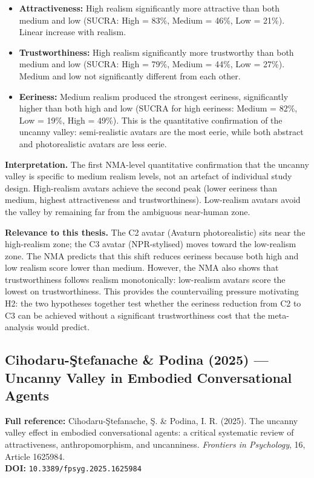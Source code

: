\documentclass[11pt, a4paper]{article}
\begin{document}
\begin{itemize}[leftmargin=2em]
  \item \textbf{Attractiveness:} High realism significantly more attractive than both medium and low (SUCRA: High = 83\%, Medium = 46\%, Low = 21\%). Linear increase with realism.
  \item \textbf{Trustworthiness:} High realism significantly more trustworthy than both medium and low (SUCRA: High = 79\%, Medium = 44\%, Low = 27\%). Medium and low not significantly different from each other.
  \item \textbf{Eeriness:} Medium realism produced the strongest eeriness, significantly higher than both high and low (SUCRA for high eeriness: Medium = 82\%, Low = 19\%, High = 49\%). This is the quantitative confirmation of the uncanny valley: semi-realistic avatars are the most eerie, while both abstract and photorealistic avatars are less eerie.
\end{itemize}

\textbf{Interpretation.} The first NMA-level quantitative confirmation that the uncanny valley is specific to medium realism levels, not an artefact of individual study design. High-realism avatars achieve the second peak (lower eeriness than medium, highest attractiveness and trustworthiness). Low-realism avatars avoid the valley by remaining far from the ambiguous near-human zone.

\textbf{Relevance to this thesis.} The C2 avatar (Avaturn photorealistic) sits near the high-realism zone; the C3 avatar (NPR-stylised) moves toward the low-realism zone. The NMA predicts that this shift reduces eeriness because both high and low realism score lower than medium. However, the NMA also shows that trustworthiness follows realism monotonically: low-realism avatars score the lowest on trustworthiness. This provides the countervailing pressure motivating H2: the two hypotheses together test whether the eeriness reduction from C2 to C3 can be achieved without a significant trustworthiness cost that the meta-analysis would predict.

\vspace{8pt}
\subsection{Cihodaru-\c{S}tefanache \& Podina (2025) --- Uncanny Valley in Embodied Conversational Agents}

\begin{refbox}
\textbf{Full reference:} Cihodaru-\c{S}tefanache, \c{S}. \& Podina, I. R. (2025). The uncanny valley effect in embodied conversational agents: a critical systematic review of attractiveness, anthropomorphism, and uncanniness. \textit{Frontiers in Psychology}, 16, Article 1625984.\\[4pt]
\textbf{DOI:} \texttt{10.3389/fpsyg.2025.1625984}
\end{refbox}
\end{document}
